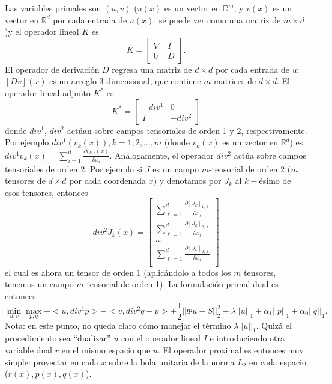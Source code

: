\documentclass[12pt,draftcls, onecolumn, letterpaper,compsoc]{IEEEtran}
\begin{document}
Las variables primales son $(u, v)$ ($u(x)$ es un vector en $\mathbb{R}^{m}$, y $v(x)$ es un vector en $\mathbb{R}^{d}$ por cada entrada de $u(x)$, se puede ver como una matriz de $m\times d$)y el operador lineal $K$ es 
\begin{equation}
	K=\left[\begin{array}{cl}
		\nabla & I\\
		0 & D
	\end{array}\right].
\end{equation}
El operador de derivaci\'{o}n $D$ regresa una matriz de $d\times d$ por cada entrada de $u$: $[Dv](x)$ es un arreglo 3-dimensional, que contiene $m$ matrices de $d\times d$. El operador lineal adjunto $K^{*}$ es
\begin{equation}
	K^*=\left[\begin{array}{cl}
		-div^{1} & 0\\ 
		I & -div^{2}
	\end{array}\right]
\end{equation}
donde $div^{1}$, $div^{2}$ act\'{u}an sobre campos tensoriales de orden 1 y 2, respectivamente. Por ejemplo $div^{1}(v_{k}(x)), k=1,2,...,m$ (donde $v_k(x)$ es un vector en $\mathbb{R}^{d}$) es
$div^{1}v_{k}(x)=\sum_{i=1}^{d}\frac{\partial v_{k,i}(x)}{\partial x_{i}}$. An\'{a}logamente, el operador $div^{2}$ act\'{u}a sobre campos tensoriales de orden 2. Por ejemplo si $J$ es un campo $m$-tensorial de orden 2 ($m$ tensores de $d\times d$ por cada coordenada $x$) y denotamos por $J_k$ al $k-$\'{e}simo de esos tensores, entonces
\begin{equation}
	div^{2}J_{k}(x)=
	\left[\begin{array}{l}
		\sum_{\ell=1}^{d}\frac{\partial[J_{k}]_{1,\ell}}{\partial x_{\ell}}\\
		\sum_{\ell=1}^{d}\frac{\partial[J_{k}]_{2,\ell}}{\partial x_{\ell}}\\
		...\\
		\sum_{\ell=1}^{d}\frac{\partial[J_{k}]_{d,\ell}}{\partial x_{\ell}}\\
	\end{array}\right]
\end{equation}
el cual es ahora un tensor de orden 1 (aplic\'{a}ndolo a todos los $m$ tensores, tenemos un campo $m$-tensorial de orden 1). La formulaci\'{o}n primal-dual  es entonces
\begin{equation}
	\min_{u,v} \max_{p,q}-<u, div^{1}p> - <v, div^{2}q-p>+\frac{1}{2}||\Phi u - S||_{2}^{2} + \lambda ||u||_1 + \alpha_{1}||p||_{1} + \alpha_{0}||q||_{1}.
\end{equation}
Nota: en este punto, no queda claro c\'{o}mo manejar el t\'{e}rmino $\lambda||u||_{1}$. Quiz\'{a} el procedimiento sea ``dualizar'' $u$ con el operador lineal $I$ e introduciendo otra variable dual $r$ en el mismo espacio que $u$. El operador proximal es entonces muy simple: proyectar en cada $x$ sobre la bola unitaria de la norma $L_{2}$ en cada espacio ($r(x), p(x), q(x)$).
\end{document}
